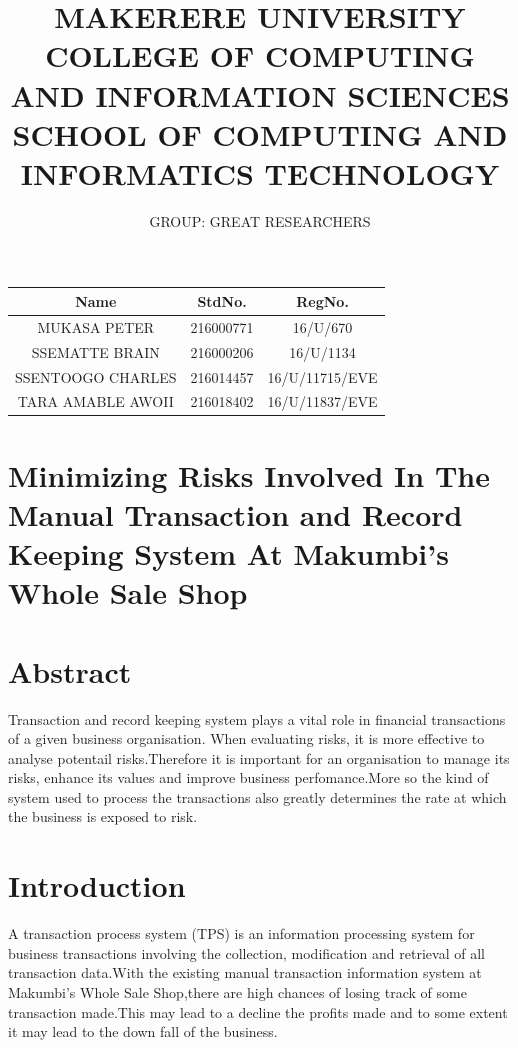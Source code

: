 \documentclass[12pt]{article}
\title{MAKERERE UNIVERSITY
COLLEGE OF COMPUTING AND INFORMATION SCIENCES
SCHOOL OF COMPUTING AND INFORMATICS TECHNOLOGY}
\author{GROUP: GREAT RESEARCHERS}
\begin{document}
\maketitle
\begin{table}[h!]
\begin{center}
\begin{tabular}{|c|c|c|}
\hline
\textbf{Name} & \textbf{StdNo.} & \textbf{RegNo.}\\
\hline
MUKASA PETER & 216000771 & 16/U/670\\
\hline
SSEMATTE BRAIN & 216000206 & 16/U/1134\\
\hline
SSENTOOGO CHARLES & 216014457 & 16/U/11715/EVE\\
\hline
TARA AMABLE AWOII & 216018402 & 16/U/11837/EVE\\
\hline
\end{tabular}
\end{center}
\end{table}
\newpage
\section*{Minimizing Risks Involved In The Manual Transaction and Record Keeping System At Makumbi's Whole Sale Shop}
\maketitle
\section{Abstract}
Transaction and record keeping system plays a vital role in financial transactions of a given business organisation. When evaluating risks, it is more effective to analyse potentail risks.Therefore it is important for an organisation to manage its risks, enhance its values and improve business perfomance.More so the kind of system used to process the transactions also greatly determines the rate at which the business is exposed to risk. 
\section{Introduction}
A transaction process system \cite{r1}(TPS) is an information processing system for business transactions involving the collection, modification and retrieval of all transaction data.With the existing manual transaction information system at Makumbi's Whole Sale Shop,there are high chances of losing track of some transaction made.This may lead to a decline the profits made and to some extent it may lead to the down fall of the business. \\
\end{document}
